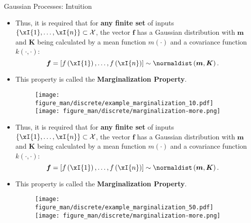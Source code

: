 \begin{frame}[c,allowframebreaks]{Gaussian Processes: Intuition}
\begin{itemize}
\item Thus, it is required that for \textbf{any finite set} of inputs $\{\xI{1},\dots,\xI{n}\} \subset \Xspace$, the vector $\mathbf{f}$ has a Gaussian distribution with $\bm{m}$ and $\bm{K}$ being calculated by a mean function $m(\cdot)$ and a covariance function $k(\cdot,\cdot)$:\vspace{-.2cm}$$\bm{f} = \left[f\left(\xI{1}\right),\dots, f\left(\xI{n}\right)\right] \sim\normaldist\left(\bm{m},\bm{K}\right).$$
    
\item This property is called the \textbf{Marginalization Property}. 
\vspace{.15cm}
\begin{figure}
\texttt{[image: figure\_man/discrete/example\_marginalization\_10.pdf]}
\texttt{[image: figure\_man/discrete/marginalization-more.png]}
\end{figure}
\end{itemize}


\framebreak


\begin{itemize}
\item Thus, it is required that for \textbf{any finite set} of inputs $\{\xI{1},\dots,\xI{n}\} \subset \Xspace$, the vector $\mathbf{f}$ has a Gaussian distribution with $\bm{m}$ and $\bm{K}$ being calculated by a mean function $m(\cdot)$ and a covariance function $k(\cdot,\cdot)$:\vspace{-.2cm}$$\bm{f} = \left[f\left(\xI{1}\right),\dots, f\left(\xI{n}\right)\right] \sim\normaldist\left(\bm{m},\bm{K}\right).$$
    
\item This property is called the \textbf{Marginalization Property}. 
\vspace{.15cm}
\begin{figure}
\texttt{[image: figure\_man/discrete/example\_marginalization\_50.pdf]}
\texttt{[image: figure\_man/discrete/marginalization-more.png]}
\end{figure}
\end{itemize}
\end{frame}

